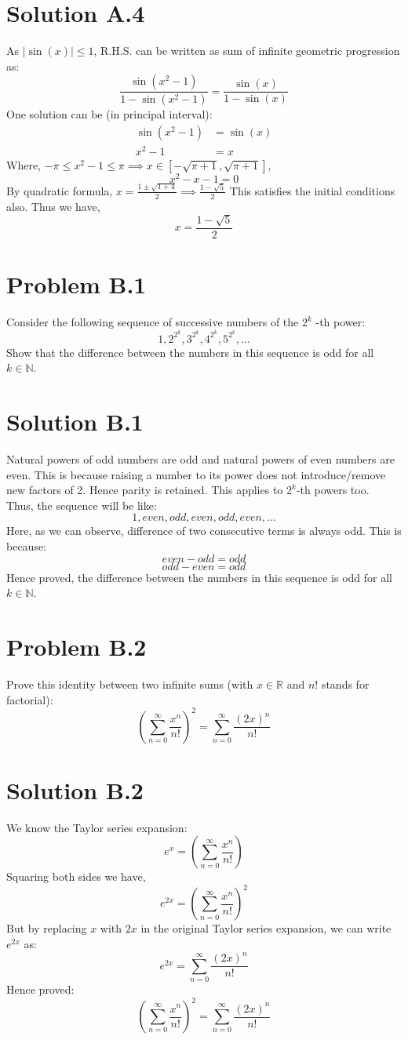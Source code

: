 \documentclass{article}
\begin{document}
\section*{Solution A.4}
As $|\sin(x)| \leq 1$, R.H.S. can be written as sum of infinite geometric progression as:
\[\frac{\sin(x^{2}-1)}{1-\sin(x^{2}-1)}=\frac{\sin(x)}{1-\sin(x)}\]
One solution can be (in principal interval):
\begin{align*}
    \sin(x^{2}-1)&=\sin(x) \\
    x^{2}-1&=x
\end{align*}
Where, $-\pi \leq x^{2}-1 \leq \pi \implies x \in [-\sqrt{\pi+1}, \sqrt{\pi+1}]$,
\[x^2-x-1=0\]
By quadratic formula,
$x=\frac{1\pm \sqrt{1+4}}{2} \implies \frac{1-\sqrt{5}}{2}$
This satisfies the initial conditions also. Thus we have,
\[\boxed{x=\frac{1-\sqrt{5}}{2}}\]

\newpage
\section*{Problem B.1}
Consider the following sequence of successive numbers of the $2^{k}$ -th power:
$$
1,2^{2^{k}}, 3^{2^{k}}, 4^{2^{k}}, 5^{2^{k}}, \ldots
$$
Show that the difference between the numbers in this sequence is odd for all $k \in \mathbb{N}$.
\section*{Solution B.1}
Natural powers of odd numbers are odd and natural powers of even numbers are even. This is because raising a number to its power does not introduce/remove new factors of 2. Hence parity is retained. This applies to $2^{k}$-th powers too. \\
Thus, the sequence will be like:
\[1, even, odd, even, odd, even, \ldots\]
Here, as we can observe, difference of two consecutive terms is always odd. This is because:
\[even-odd = odd\]
\[odd-even = odd\]
Hence proved, the difference between the numbers in this sequence is odd for all $k \in \mathbb{N}$.

\newpage
\section*{Problem B.2}
Prove this identity between two infinite sums (with $x \in \mathbb{R}$ and $n !$ stands for factorial):
$$
\left(\sum_{n=0}^{\infty} \frac{x^{n}}{n!}\right)^{2}=\sum_{n=0}^{\infty} \frac{(2 x)^{n}}{n!}
$$
\section*{Solution B.2}
We know the Taylor series expansion:
\[e^{x}=\left(\sum_{n=0}^{\infty} \frac{x^{n}}{n !}\right)\]
Squaring both sides we have,
\[e^{2x}=\left(\sum_{n=0}^{\infty} \frac{x^{n}}{n !}\right)^{2}\]
But by replacing $x$ with $2x$ in the original Taylor series expansion, we can write $e^{2x}$ as:
\[e^{2x}=\sum_{n=0}^{\infty} \frac{(2 x)^{n}}{n!}\]
Hence proved:
\[\boxed{\left(\sum_{n=0}^{\infty} \frac{x^{n}}{n!}\right)^{2}=\sum_{n=0}^{\infty} \frac{(2 x)^{n}}{n!}}\]
\end{document}
